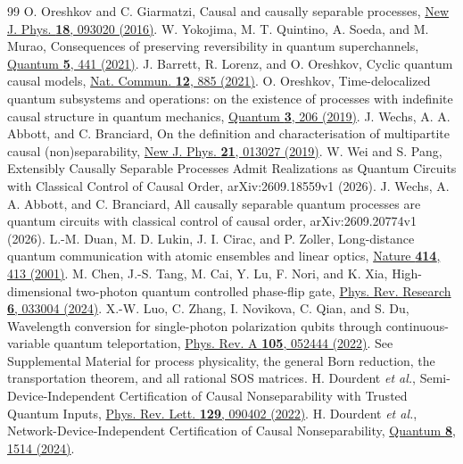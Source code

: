 \documentclass[aps,prl,reprint,superscriptaddress,longbibliography,bibnotes,floatfix]{revtex4-2}
\begin{document}
\begin{thebibliography}{99}
 O. Oreshkov and C. Giarmatzi, Causal and causally separable processes, \href{https://doi.org/10.1088/1367-2630/18/9/093020}{New J. Phys. \textbf{18}, 093020 (2016)}.
 W. Yokojima, M. T. Quintino, A. Soeda, and M. Murao, Consequences of preserving reversibility in quantum superchannels, \href{https://doi.org/10.22331/q-2021-04-26-441}{Quantum \textbf{5}, 441 (2021)}.
 J. Barrett, R. Lorenz, and O. Oreshkov, Cyclic quantum causal models, \href{https://doi.org/10.1038/s41467-020-20456-x}{Nat. Commun. \textbf{12}, 885 (2021)}.
 O. Oreshkov, Time-delocalized quantum subsystems and operations: on the existence of processes with indefinite causal structure in quantum mechanics, \href{https://doi.org/10.22331/q-2019-12-02-206}{Quantum \textbf{3}, 206 (2019)}.
 J. Wechs, A. A. Abbott, and C. Branciard, On the definition and characterisation of multipartite causal (non)separability, \href{https://doi.org/10.1088/1367-2630/aaf352}{New J. Phys. \textbf{21}, 013027 (2019)}.
 W. Wei and S. Pang, Extensibly Causally Separable Processes Admit Realizations as Quantum Circuits with Classical Control of Causal Order, arXiv:2609.18559v1 (2026).
 J. Wechs, A. A. Abbott, and C. Branciard, All causally separable quantum processes are quantum circuits with classical control of causal order, arXiv:2609.20774v1 (2026).
 L.-M. Duan, M. D. Lukin, J. I. Cirac, and P. Zoller, Long-distance quantum communication with atomic ensembles and linear optics, \href{https://doi.org/10.1038/35106500}{Nature \textbf{414}, 413 (2001)}.
 M. Chen, J.-S. Tang, M. Cai, Y. Lu, F. Nori, and K. Xia, High-dimensional two-photon quantum controlled phase-flip gate, \href{https://doi.org/10.1103/PhysRevResearch.6.033004}{Phys. Rev. Research \textbf{6}, 033004 (2024)}.
 X.-W. Luo, C. Zhang, I. Novikova, C. Qian, and S. Du, Wavelength conversion for single-photon polarization qubits through continuous-variable quantum teleportation, \href{https://doi.org/10.1103/PhysRevA.105.052444}{Phys. Rev. A \textbf{105}, 052444 (2022)}.
 See Supplemental Material for process physicality, the general Born reduction, the transportation theorem, and all rational SOS matrices.
 H. Dourdent \emph{et al.}, Semi-Device-Independent Certification of Causal Nonseparability with Trusted Quantum Inputs, \href{https://doi.org/10.1103/PhysRevLett.129.090402}{Phys. Rev. Lett. \textbf{129}, 090402 (2022)}.
 H. Dourdent \emph{et al.}, Network-Device-Independent Certification of Causal Nonseparability, \href{https://doi.org/10.22331/q-2024-10-30-1514}{Quantum \textbf{8}, 1514 (2024)}.

\end{thebibliography}
\end{document}
